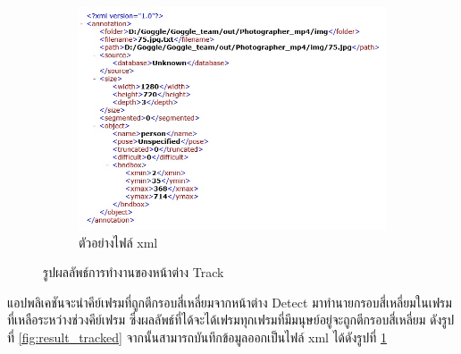 \begin{figure}[!ht]
\begin{subfigure}[b]{0.7\linewidth}
      \includegraphics[width=\linewidth]{chapter4/images/Result/result_select7.jpg}
      \caption{ตัวอย่างไฟล์ xml}
      \label{fig:result_track_xml}
    \end{subfigure}
    \caption{รูปผลลัพธ์การทำงานของหน้าต่าง Track}
    \label{fig:result_track}
  \end{figure}
แอปพลิเคชันจะนำคีย์เฟรมที่ถูกตีกรอบสี่เหลี่ยมจากหน้าต่าง Detect มาทำนายกรอบสี่เหลี่ยมในเฟรมที่เหลือระหว่างช่วงคีย์เฟรม ซึ่งผลลัพธ์ที่ได้จะได้เฟรมทุกเฟรมที่มีมนุษย์อยู่จะถูกตีกรอบสี่เหลี่ยม 
ดังรูปที่ \ref{fig:result_tracked} จากนั้นสามารถบันทึกข้อมูลออกเป็นไฟล์ xml ได้ดังรูปที่ \ref{fig:result_track_xml}

\clearpage
